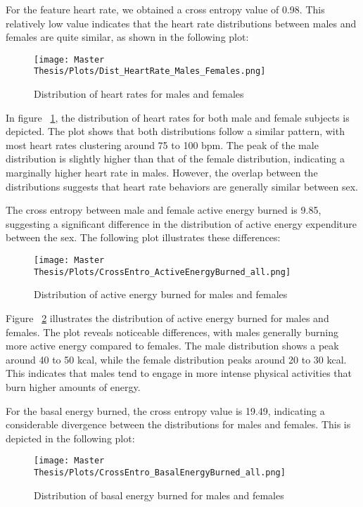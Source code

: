 For the feature heart rate, we obtained a cross entropy value of 0.98. This relatively low value indicates that the heart rate distributions between males and females are quite similar, as shown in the following plot:

\FloatBarrier
\begin{figure}[h!]
\centering
\texttt{[image: Master Thesis/Plots/Dist\_HeartRate\_Males\_Females.png]}
\caption{Distribution of heart rates for males and females}
\label{fig:crossHeart}
\end{figure}
\FloatBarrier

In figure ~\ref{fig:crossHeart}, the distribution of heart rates for both male and female subjects is depicted. The plot shows that both distributions follow a similar pattern, with most heart rates clustering around 75 to 100 bpm. The peak of the male distribution is slightly higher than that of the female distribution, indicating a marginally higher heart rate in males. However, the overlap between the distributions suggests that heart rate behaviors are generally similar between sex.

The cross entropy between male and female active energy burned is 9.85, suggesting a significant difference in the distribution of active energy expenditure between the sex. The following plot illustrates these differences:

\FloatBarrier
\begin{figure}[h!]
\centering
\texttt{[image: Master Thesis/Plots/CrossEntro\_ActiveEnergyBurned\_all.png]}
\caption{Distribution of active energy burned for males and females}
\label{fig:distActBurn}
\end{figure}
\FloatBarrier

Figure ~\ref{fig:distActBurn} illustrates the distribution of active energy burned for males and females. The plot reveals noticeable differences, with males generally burning more active energy compared to females. The male distribution shows a peak around 40 to 50 kcal, while the female distribution peaks around 20 to 30 kcal. This indicates that males tend to engage in more intense physical activities that burn higher amounts of energy.

For the basal energy burned, the cross entropy value is 19.49, indicating a considerable divergence between the distributions for males and females. This is depicted in the following plot:

\FloatBarrier
\begin{figure}[h!]
\centering
\texttt{[image: Master Thesis/Plots/CrossEntro\_BasalEnergyBurned\_all.png]}
\caption{Distribution of basal energy burned for males and females}
\label{fig:Distbasburn}
\end{figure}
\FloatBarrier

